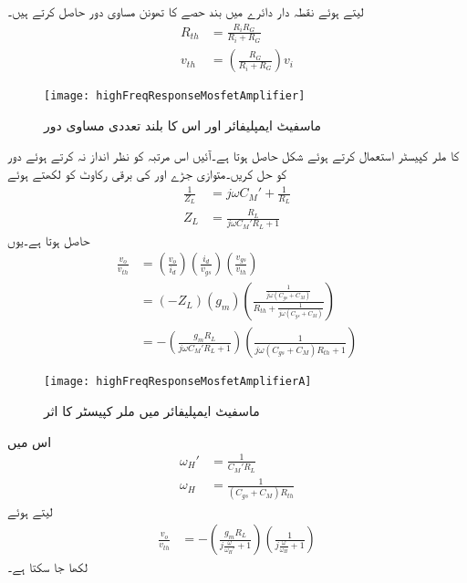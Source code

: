 لیتے ہوئے نقطہ دار دائرے میں بند حصے کا تھونن مساوی دور حاصل کرتے ہیں۔
\begin{align*}
R_{th}&=\frac{R_i  R_G}{R_i+R_G}\\
v_{th}&=\left(\frac{R_G}{R_i+R_G} \right) v_i
\end{align*}
%
\begin{figure}
\centering
\texttt{[image: highFreqResponseMosfetAmplifier]}
\caption{ماسفیٹ ایمپلیفائر اور اس کا بلند تعددی مساوی دور}
\label{شکل_تعددی_ردعمل_ماسفیٹ_مشترکہ_مخارج}
\end{figure}
 کا ملر کپیسٹر استعمال کرتے ہوئے شکل  حاصل ہوتا ہے۔آئیں اس مرتبہ  کو نظر انداز نہ کرتے ہوئے دور کو حل کریں۔متوازی جڑے  اور  کی برقی رکاوٹ کو  لکھتے ہوئے
\begin{align*}
\frac{1}{Z_L}&=j \omega C_M' +\frac{1}{R_L}\\
Z_L&=\frac{R_L}{j \omega C_M' R_L+1}
\end{align*}
حاصل ہوتا ہے۔یوں
\begin{align*}
\frac{v_o}{v_{th}}&=\left(\frac{v_o}{i_d} \right) \left(\frac{i_d}{v_{gs}} \right) \left(\frac{v_{gs}}{v_{th}} \right)\\
&=\left(- Z_L \right) \left(g_m \right) \left(\frac{\frac{1}{j \omega (C_{gs}+C_M)}}{R_{th}+\frac{1}{j \omega (C_{gs}+C_M)}} \right)\\
&=-\left(\frac{g_m R_L}{j \omega C_M' R_L+1} \right) \left(\frac{1}{j \omega (C_{gs}+C_M) R_{th}+1} \right)
\end{align*}
%
\begin{figure}
\centering
\texttt{[image: highFreqResponseMosfetAmplifierA]}
\caption{ماسفیٹ ایمپلیفائر میں ملر کپیسٹر کا اثر}
\label{شکل_تعددی_ردعمل_ماسفیٹ_مشترکہ_مخارج_ملر}
\end{figure}
اس میں
\begin{align}
\omega_H'&=\frac{1}{C_M' R_L}\\
\omega_H&=\frac{1}{\left(C_{gs}+C_M\right) R_{th}}
\end{align}
لیتے ہوئے
\begin{align}
\frac{v_o}{v_{th}}&=-\left(\frac{g_m R_L}{j \frac{\omega}{\omega_H'}+1} \right) \left(\frac{1}{j \frac{\omega}{\omega_H} +1} \right)
\end{align}
لکھا جا سکتا ہے۔

